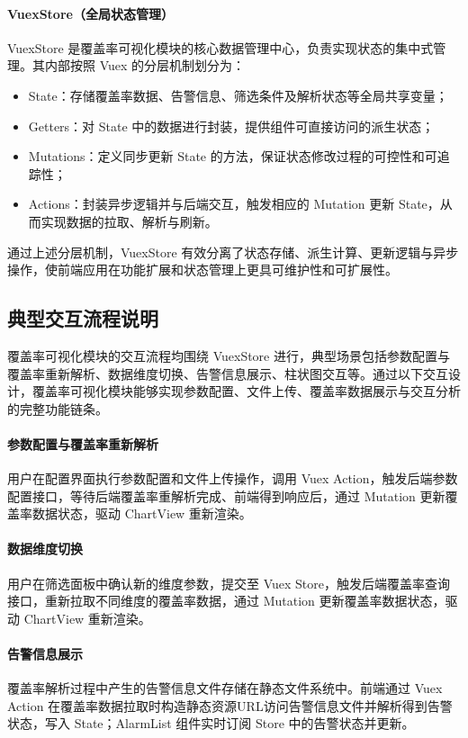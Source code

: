 \paragraph{VuexStore（全局状态管理）}
VuexStore 是覆盖率可视化模块的核心数据管理中心，负责实现状态的集中式管理。其内部按照 Vuex 的分层机制划分为：
\begin{itemize}
    \item State：存储覆盖率数据、告警信息、筛选条件及解析状态等全局共享变量；
    \item Getters：对 State 中的数据进行封装，提供组件可直接访问的派生状态；
    \item Mutations：定义同步更新 State 的方法，保证状态修改过程的可控性和可追踪性；
    \item Actions：封装异步逻辑并与后端交互，触发相应的 Mutation 更新 State，从而实现数据的拉取、解析与刷新。
\end{itemize}

通过上述分层机制，VuexStore 有效分离了状态存储、派生计算、更新逻辑与异步操作，使前端应用在功能扩展和状态管理上更具可维护性和可扩展性。

\subsection{典型交互流程说明}
覆盖率可视化模块的交互流程均围绕 VuexStore 进行，典型场景包括参数配置与覆盖率重新解析、数据维度切换、告警信息展示、柱状图交互等。通过以下交互设计，覆盖率可视化模块能够实现参数配置、文件上传、覆盖率数据展示与交互分析的完整功能链条。

\paragraph{参数配置与覆盖率重新解析}
用户在配置界面执行参数配置和文件上传操作，调用 Vuex Action，触发后端参数配置接口，等待后端覆盖率重解析完成、前端得到响应后，通过 Mutation 更新覆盖率数据状态，驱动 ChartView 重新渲染。

\paragraph{数据维度切换}
用户在筛选面板中确认新的维度参数，提交至 Vuex Store，触发后端覆盖率查询接口，重新拉取不同维度的覆盖率数据，通过 Mutation 更新覆盖率数据状态，驱动 ChartView 重新渲染。

\paragraph{告警信息展示}
覆盖率解析过程中产生的告警信息文件存储在静态文件系统中。前端通过 Vuex Action 在覆盖率数据拉取时构造静态资源URL访问告警信息文件并解析得到告警状态，写入 State；AlarmList 组件实时订阅 Store 中的告警状态并更新。

